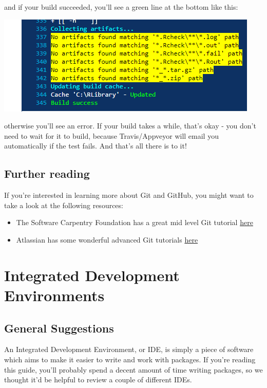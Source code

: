 \documentclass[
]{book}
\begin{document}
and if your build succeeded, you'll see a green line at the bottom like this:

\includegraphics{images/testSS/appveyor3.PNG}

otherwise you'll see an error. If your build takes a while, that's okay - you don't need to wait for it to build, because Travis/Appveyor will email you automatically if the test fails. And that's all there is to it!

\hypertarget{further-reading}{%
\section{Further reading}\label{further-reading}}

If you're interested in learning more about Git and GitHub, you might want to take a look at the following resources:

\begin{itemize}
\item
  The Software Carpentry Foundation has a great mid level Git tutorial \href{https://swcarpentry.GitHub.io/git-novice/}{here}
\item
  Atlassian has some wonderful advanced Git tutorials \href{https://www.atlassian.com/git/tutorials/advanced-overview}{here}
\end{itemize}

\hypertarget{integrated-development-environments}{%
\chapter{Integrated Development Environments}\label{integrated-development-environments}}

\hypertarget{general-suggestions}{%
\section{General Suggestions}\label{general-suggestions}}

An Integrated Development Environment, or IDE, is simply a piece of software which aims to make it easier to write and work with packages. If you're reading this guide, you'll probably spend a decent amount of time writing packages, so we thought it'd be helpful to review a couple of different IDEs.
\end{document}
